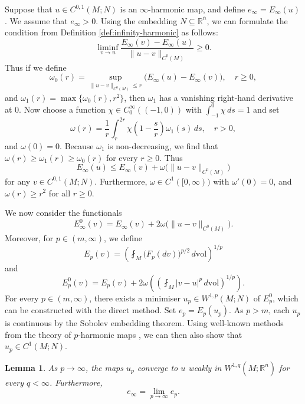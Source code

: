 \documentclass[10pt,a4paper]{amsart}
\newcommand{\R}{\mathbb{R}}
\newcommand{\vol}{\mathrm{vol}}
\newcommand{\ndim}{{\bar{n}}}
\newtheorem{lemma}[theorem]{Lemma}
\begin{document}
Suppose that $u \in C^{0,1}(M; N)$ is an $\infty$-harmonic map,
and define $e_\infty = E_\infty(u)$. We assume that $e_\infty > 0$.
Using the embedding $N \subseteq \R^\ndim$, we can formulate the condition from Definition \ref{def:infinity-harmonic}
as follows:
\[
\liminf_{v \to u} \frac{E_\infty(v) - E_\infty(u)}{\|u - v\|_{C^0(M)}} \ge 0.
\]
Thus if we define
\[
\omega_0(r) = \sup_{\|u - v\|_{C^0(M)} \le r} \bigl(E_\infty(u) - E_\infty(v)\bigr), \quad r \ge 0,
\]
and $\omega_1(r) = \max\{\omega_0(r), r^2\}$, then $\omega_1$ has a vanishing right-hand derivative
at $0$. Now choose a function $\chi \in C_0^\infty((-1, 0))$ with $\int_{-1}^0 \chi \, ds = 1$ and
set
\[
\omega(r) = \frac{1}{r} \int_r^{2r} \chi\left(1 - \frac{s}{r}\right) \omega_1(s) \, ds, \quad r > 0,
\]
and $\omega(0) = 0$. Because $\omega_1$ is non-decreasing, we find that $\omega(r) \ge \omega_1(r) \ge \omega_0(r)$
for every $r \ge 0$. Thus
\begin{equation} \label{eq:u-is-infinity-harmonic}
E_\infty(u) \le E_\infty(v) + \omega\bigl(\|u - v\|_{C^0(M)}\bigr)
\end{equation}
for any $v \in C^{0, 1}(M; N)$. Furthermore, $\omega \in C^1([0, \infty))$
with $\omega'(0) = 0$, and $\omega(r) \ge r^2$ for all $r \ge 0$.

We now consider the functionals
\[
E_\infty^0(v) = E_\infty(v) + 2\omega\bigl(\|u - v\|_{C^0(M)}\bigr).
\]
Moreover, for $p \in (m, \infty)$, we define
\[
E_p(v) = \left(\fint_M \bigl(F_p(dv)\bigr)^{p/2} \, d\vol\right)^{1/p}
\]
and
\[
E_p^0(v) = E_p(v) + 2\omega\left(\left(\fint_M |v - u|^p \, d\vol\right)^{1/p}\right).
\]
For every $p \in (m, \infty)$, there exists a minimiser $u_p \in W^{1, p}(M; N)$ of $E_p^0$, which can be constructed with the direct method.
Set $e_p = E_p(u_p)$.
As $p > m$, each $u_p$ is continuous by the Sobolev embedding theorem. Using
well-known methods from the theory of $p$-harmonic maps \cite{Hardt-Lin:87, Duzaar-Mingione:04}, we can then also show that $u_p \in C^1(M; N)$.

\begin{lemma} \label{lem:convergence-to-u}
As $p \to \infty$, the maps $u_p$ converge to $u$ weakly in $W^{1, q}(M; \R^\ndim)$ for every $q < \infty$. Furthermore,
\[
e_\infty = \lim_{p \to \infty} e_p.
\]
\end{lemma}
\end{document}
